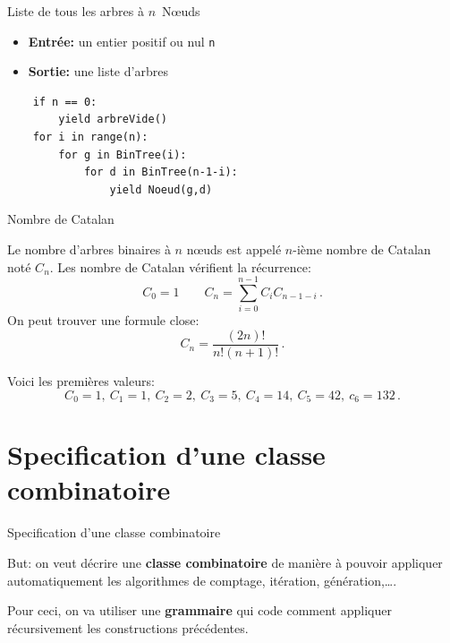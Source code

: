 \documentclass{beamer}
\begin{document}
\begin{frame}[fragile]{Liste de tous les arbres à $n$~N\oe uds}
   \begin{ALGO}
    \begin{itemize}
    \item \textbf{Entrée:} un entier positif ou nul \texttt{n}
    \item \textbf{Sortie:} une liste d'arbres
    \end{itemize}
\begin{verbatim}
    if n == 0:
        yield arbreVide()
    for i in range(n):
        for g in BinTree(i):
            for d in BinTree(n-1-i):
                yield Noeud(g,d)
\end{verbatim}
  \end{ALGO}
\end{frame}

\begin{frame}{Nombre de Catalan}
  \begin{PROP}
    Le nombre d'arbres binaires à $n$ n\oe uds est appelé $n$-ième nombre de
    Catalan noté $C_n$. Les nombre de Catalan vérifient la récurrence:
    \begin{equation*}
      C_0=1\qquad C_n = \sum_{i=0}^{n-1} C_i C_{n-1-i}\,.
    \end{equation*}
    On peut trouver une formule close:
    \begin{equation*}
      C_n = \frac{(2n)!}{n!(n+1)!}\,.
    \end{equation*}
  \end{PROP}
  Voici les premières valeurs:
  \[C_0=1,\ C_1=1,\ C_2=2,\ C_3=5,\ C_4=14,\ C_5=42,\ c_6=132\,.\]
\end{frame}

\section{Specification d'une classe combinatoire}
\begin{frame}{Specification d'une classe combinatoire}

  But: on veut décrire une \textbf{classe combinatoire} de manière à pouvoir
  appliquer automatiquement les algorithmes de comptage, itération,
  génération,\dots.
  \bigskip

  Pour ceci, on va utiliser une \textbf{grammaire} qui code comment appliquer
  récursivement les constructions précédentes.
\end{frame}
\end{document}
